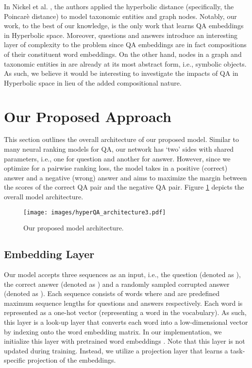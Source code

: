 \documentclass[sigconf]{acmart}
\begin{document}
In Nickel et al. \cite{DBLP:journals/corr/NickelK17}, the authors applied the hyperbolic distance (specifically, the Poincar\`e distance) to model taxonomic entities and graph nodes. Notably, our work, to the best of our knowledge, is the only work that learns QA embeddings in Hyperbolic space. Moreover, questions and answers introduce an interesting layer of complexity to the problem since QA embeddings are in fact compositions of their constituent word embeddings. On the other hand, nodes in a graph and taxonomic entities in \cite{DBLP:journals/corr/NickelK17} are already at its most abstract form, i.e., symbolic objects. As such, we believe it would be interesting to investigate the impacts of QA in Hyperbolic space in lieu of the added compositional nature. 


\section{Our Proposed Approach}
This section outlines the overall architecture of our proposed model. Similar to many neural ranking models for QA, our network has `two' sides with shared parameters, i.e., one for question and another for answer. However, since we optimize for a pairwise ranking loss, the model takes in a positive (correct) answer and a negative (wrong) answer and aims to maximize the margin between the scores of the correct QA pair and the negative QA pair. Figure \ref{overall} depicts the overall model architecture. 
\begin{figure}[ht]
\begin{center}
\texttt{[image: images/hyperQA\_architecture3.pdf]}
\caption{Our proposed model architecture.}
\label{overall}
\end{center}
\end{figure}
\vspace{-1em}

\subsection{Embedding Layer}
Our model accepts three sequences as an input, i.e., the question (denoted as ), the correct answer (denoted as ) and a randomly sampled corrupted answer (denoted as ). Each sequence consists of  words where  and  are predefined maximum sequence lengths for questions and answers respectively. Each word is represented as a one-hot vector (representing a word in the vocabulary). As such, this layer is a look-up layer that converts each word into a low-dimensional vector by indexing onto the word embedding matrix. In our implementation, we initialize this layer with pretrained word embeddings \cite{DBLP:conf/emnlp/PenningtonSM14}. Note that this layer is not updated during training. Instead, we utilize a projection layer that learns a task-specific projection of the embeddings. 
\end{document}
